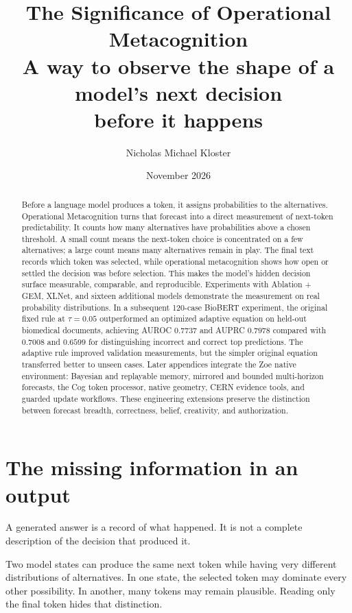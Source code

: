 \documentclass[11pt,a4paper]{article}
\title{\textbf{The Significance of Operational Metacognition}\\[5pt]
\large A way to observe the shape of a model's next decision\\before it happens}
\author{Nicholas Michael Kloster}
\date{November 2026}
\begin{document}
\maketitle
\thispagestyle{fancy}

\begin{abstract}
Before a language model produces a token, it assigns probabilities to the alternatives. Operational Metacognition turns that forecast into a direct measurement of next-token predictability. It counts how many alternatives have probabilities above a chosen threshold. A small count means the next-token choice is concentrated on a few alternatives; a large count means many alternatives remain in play. The final text records which token was selected, while operational metacognition shows how open or settled the decision was before selection. This makes the model's hidden decision surface measurable, comparable, and reproducible. Experiments with Ablation + GEM, XLNet, and sixteen additional models demonstrate the measurement on real probability distributions. In a subsequent 120-case BioBERT experiment, the original fixed rule at $\tau=0.05$ outperformed an optimized adaptive equation on held-out biomedical documents, achieving AUROC $0.7737$ and AUPRC $0.7978$ compared with $0.7008$ and $0.6599$ for distinguishing incorrect and correct top predictions. The adaptive rule improved validation measurements, but the simpler original equation transferred better to unseen cases. Later appendices integrate the Zoe native environment: Bayesian and replayable memory, mirrored and bounded multi-horizon forecasts, the Cog token processor, native geometry, CERN evidence tools, and guarded update workflows. These engineering extensions preserve the distinction between forecast breadth, correctness, belief, creativity, and authorization.
\end{abstract}

\section{The missing information in an output}
A generated answer is a record of what happened. It is not a complete description of the decision that produced it.

Two model states can produce the same next token while having very different distributions of alternatives. In one state, the selected token may dominate every other possibility. In another, many tokens may remain plausible. Reading only the final token hides that distinction.
\end{document}
